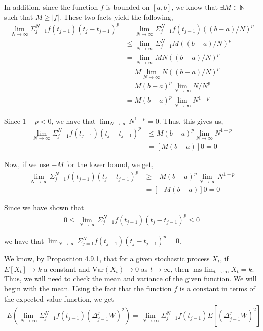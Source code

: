 \documentclass[12pt]{article}
\newenvironment{problem}[2][Problem]{\begin{trivlist}
\item[\hskip \labelsep {\bfseries #1}\hskip \labelsep {\bfseries #2.}]}{\end{trivlist}}
\begin{document}
In addition, since the function $f$ is bounded on $[a,b]$, we know that $\exists M \in \mathbb{N}$ such that $M \geq |f|$. These two facts yield the following,
\begin{align*}
\lim_{N \to \infty} \Sigma^N_{j=1} f(t_{j-1})(t_j - t_{j-1})^p &= \lim_{N \to \infty} \Sigma^N_{j=1} f(t_{j-1})((b - a)/N)^p\\
&\leq \lim_{N \to \infty} \Sigma^N_{j=1} M((b - a)/N)^p\\
&= \lim_{N \to \infty} MN((b - a)/N)^p\\
&= M \lim_{N \to \infty} N((b - a)/N)^p\\
&= M(b-a)^p \lim_{N \to \infty} N/N^p\\
&= M(b-a)^p \lim_{N \to \infty} N^{1-p}
\end{align*}

Since $1-p < 0$, we have that $\lim_{N \to \infty} N^{1-p} = 0$. Thus, this gives us,
\begin{align*}
\lim_{N \to \infty} \Sigma^N_{j=1} f(t_{j-1})(t_j - t_{j-1})^p &\leq M(b-a)^p \lim_{N \to \infty} N^{1-p}\\
&= [M(b-a)]0 = 0
\end{align*}

Now, if we use $-M$ for the lower bound, we get,
\begin{align*}
\lim_{N \to \infty} \Sigma^N_{j=1} f(t_{j-1})(t_j - t_{j-1})^p &\geq -M(b-a)^p \lim_{N \to \infty} N^{1-p}\\
&= [-M(b-a)]0 = 0
\end{align*}

Since we have shown that
\begin{align*}
0 \leq \lim_{N \to \infty} \Sigma^N_{j=1} f(t_{j-1})(t_j - t_{j-1})^p \leq 0
\end{align*}

we have that $\lim_{N \to \infty} \Sigma^N_{j=1} f(t_{j-1})(t_j - t_{j-1})^p = 0$.

\begin{problem}{10}
\end{problem}

We know, by Proposition 4.9.1, that for a given stochastic process $X_t$, if $E[X_t] \to k$ a constant and $\text{Var}(X_t) \to 0$ as $t \to \infty$, then $\operatorname{ms-\lim}_{t \to \infty} X_t = k$.\\

Thus, we will need to check the mean and variance of the given function. We will begin with the mean. Using the fact that the function $f$ is a constant in terms of the expected value function, we get
\begin{align*}
E(\lim_{N \to \infty} \Sigma^N_{j=1} f(t_{j-1}) (\Delta_{j-1}^j W)^2) = \lim_{N \to \infty} \Sigma^N_{j=1} f(t_{j-1}) E[(\Delta_{j-1}^j W)^2]
\end{align*}
\end{document}
